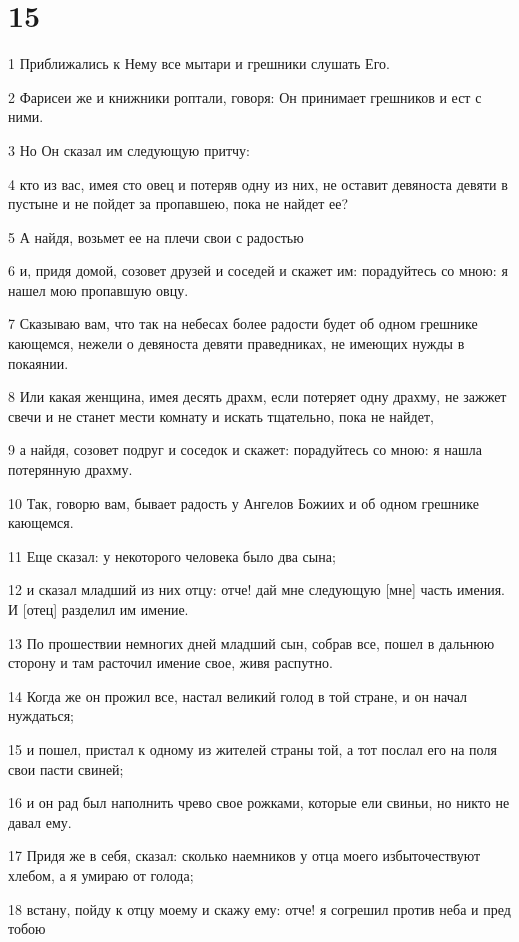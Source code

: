 \chapter{15}

\par 1 Приближались к Нему все мытари и грешники слушать Его.
\par 2 Фарисеи же и книжники роптали, говоря: Он принимает грешников и ест с ними.
\par 3 Но Он сказал им следующую притчу:
\par 4 кто из вас, имея сто овец и потеряв одну из них, не оставит девяноста девяти в пустыне и не пойдет за пропавшею, пока не найдет ее?
\par 5 А найдя, возьмет ее на плечи свои с радостью
\par 6 и, придя домой, созовет друзей и соседей и скажет им: порадуйтесь со мною: я нашел мою пропавшую овцу.
\par 7 Сказываю вам, что так на небесах более радости будет об одном грешнике кающемся, нежели о девяноста девяти праведниках, не имеющих нужды в покаянии.
\par 8 Или какая женщина, имея десять драхм, если потеряет одну драхму, не зажжет свечи и не станет мести комнату и искать тщательно, пока не найдет,
\par 9 а найдя, созовет подруг и соседок и скажет: порадуйтесь со мною: я нашла потерянную драхму.
\par 10 Так, говорю вам, бывает радость у Ангелов Божиих и об одном грешнике кающемся.
\par 11 Еще сказал: у некоторого человека было два сына;
\par 12 и сказал младший из них отцу: отче! дай мне следующую [мне] часть имения. И [отец] разделил им имение.
\par 13 По прошествии немногих дней младший сын, собрав все, пошел в дальнюю сторону и там расточил имение свое, живя распутно.
\par 14 Когда же он прожил все, настал великий голод в той стране, и он начал нуждаться;
\par 15 и пошел, пристал к одному из жителей страны той, а тот послал его на поля свои пасти свиней;
\par 16 и он рад был наполнить чрево свое рожками, которые ели свиньи, но никто не давал ему.
\par 17 Придя же в себя, сказал: сколько наемников у отца моего избыточествуют хлебом, а я умираю от голода;
\par 18 встану, пойду к отцу моему и скажу ему: отче! я согрешил против неба и пред тобою
